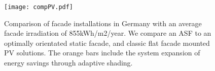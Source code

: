 


\begin{figure}[H]
\begin{center}
\texttt{[image: compPV.pdf]}
\caption{Comparison of facade installations in Germany with an average facade irradiation of 855kWh/m2/year.
We compare an ASF to an optimally orientated static facade, and classic flat facade mounted PV solutions. The orange bars include the system expansion of energy savings through adaptive shading.}
\label{fig:compPV}
\end{center}
\end{figure}

